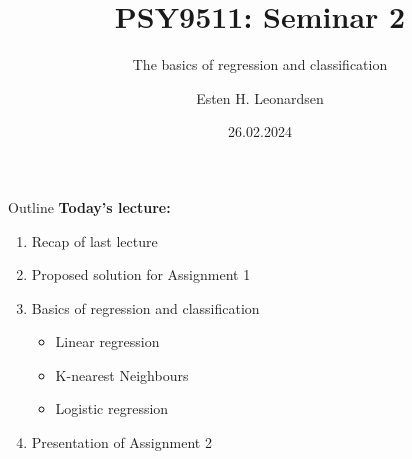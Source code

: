 \documentclass[10pt]{beamer}
\title{PSY9511: Seminar 2}
\subtitle{The basics of regression and classification}
\author{Esten H. Leonardsen}
\date{26.02.2024}
\begin{document}
	\begin{frame}
	 	\titlepage
	\end{frame}

    \begin{frame}{Outline}
        \textbf{Today's lecture:}
        \begin{enumerate}
            \item Recap of last lecture
            \item Proposed solution for Assignment 1
            \item Basics of regression and classification
            \begin{itemize}
                \item Linear regression
                \item K-nearest Neighbours
                \item Logistic regression
            \end{itemize}
            \item Presentation of Assignment 2
        \end{enumerate}
    \end{frame}

    
\end{document}
